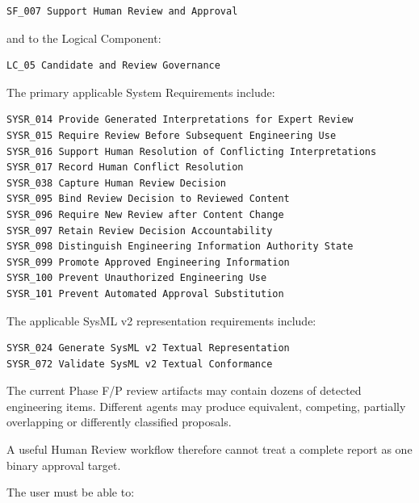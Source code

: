\begin{verbatim}
SF_007 Support Human Review and Approval
\end{verbatim}

and to the Logical Component:

\begin{verbatim}
LC_05 Candidate and Review Governance
\end{verbatim}

The primary applicable System Requirements include:

\begin{verbatim}
SYSR_014 Provide Generated Interpretations for Expert Review
SYSR_015 Require Review Before Subsequent Engineering Use
SYSR_016 Support Human Resolution of Conflicting Interpretations
SYSR_017 Record Human Conflict Resolution
SYSR_038 Capture Human Review Decision
SYSR_095 Bind Review Decision to Reviewed Content
SYSR_096 Require New Review after Content Change
SYSR_097 Retain Review Decision Accountability
SYSR_098 Distinguish Engineering Information Authority State
SYSR_099 Promote Approved Engineering Information
SYSR_100 Prevent Unauthorized Engineering Use
SYSR_101 Prevent Automated Approval Substitution
\end{verbatim}

The applicable SysML v2 representation requirements include:

\begin{verbatim}
SYSR_024 Generate SysML v2 Textual Representation
SYSR_072 Validate SysML v2 Textual Conformance
\end{verbatim}

The current Phase F/P review artifacts may contain dozens of detected engineering items. Different agents may produce equivalent, competing, partially overlapping or differently classified proposals.

A useful Human Review workflow therefore cannot treat a complete report as one binary approval target.

The user must be able to:


